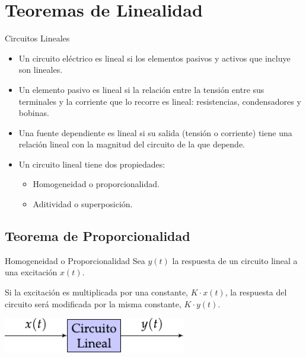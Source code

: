 \documentclass[aspectratio=169, usenames,svgnames,dvipsnames]{beamer}
\begin{document}
\section{Teoremas de Linealidad}
\label{sec:orgd896a29}
\begin{frame}[label={sec:org1246f74}]{Circuitos Lineales}
\begin{itemize}
\item Un circuito eléctrico es lineal si los elementos pasivos y activos que incluye son lineales.
\item Un \alert{elemento pasivo} es lineal si la relación entre la tensión entre sus terminales y la corriente que lo recorre es lineal: \alert{resistencias, condensadores y bobinas}.
\item Una \alert{fuente dependiente} es lineal si su salida (tensión o corriente) tiene una relación lineal con la magnitud del circuito de la que depende.
\item Un circuito lineal tiene dos propiedades:
\begin{itemize}
\item Homogeneidad o \alert{proporcionalidad}.
\item Aditividad o \alert{superposición}.
\end{itemize}
\end{itemize}
\end{frame}

\subsection{Teorema de Proporcionalidad}
\label{sec:orgbc0cb36}

\begin{frame}[label={sec:orgdd681a6}]{Homogeneidad o Proporcionalidad}
Sea \(y(t)\) la respuesta de un \alert{circuito lineal} a una excitación \(x(t)\). 

Si la excitación es multiplicada por una \alert{constante}, \(K \cdot x(t)\), la respuesta del circuito será modificada por la misma constante, \(K \cdot y(t)\).

\begin{center}
\includegraphics[width=0.6\textwidth]{../figs/proporcionalidad.pdf}
\end{center}
\end{frame}
\end{document}
